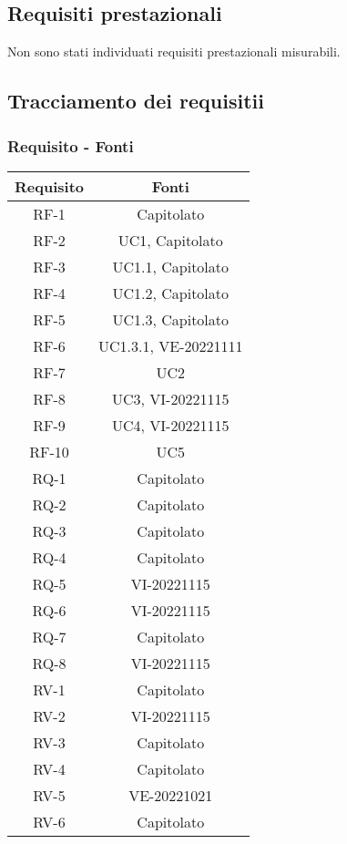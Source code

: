 \subsection{Requisiti prestazionali}
Non sono stati individuati requisiti prestazionali misurabili.


\subsection{Tracciamento dei requisitii}

\subsubsection{Requisito - Fonti}
\begin{tabular}{| c | c |} 
 \hline
 \textbf{Requisito} & \textbf{Fonti} \\
 \hline
  RF-1 & Capitolato\\
\hline
  RF-2 & UC1, Capitolato\\
\hline
  RF-3 & UC1.1, Capitolato\\
\hline
  RF-4 & UC1.2, Capitolato\\
\hline
  RF-5 & UC1.3, Capitolato\\
\hline
  RF-6 & UC1.3.1, VE-20221111\\
\hline
  RF-7 & UC2\\
\hline
  RF-8 & UC3, VI-20221115\\
\hline
  RF-9 & UC4, VI-20221115\\
\hline
  RF-10 & UC5\\
\hline
  RQ-1 & Capitolato\\
\hline
  RQ-2 & Capitolato\\
\hline
  RQ-3 & Capitolato\\
\hline
  RQ-4 & Capitolato\\
\hline
  RQ-5 & VI-20221115\\
\hline
  RQ-6 & VI-20221115\\
\hline
  RQ-7 & Capitolato\\
\hline
  RQ-8 & VI-20221115\\
\hline
  RV-1 & Capitolato\\
\hline
  RV-2 & VI-20221115\\
\hline
  RV-3 & Capitolato\\
\hline
  RV-4 & Capitolato\\
\hline
  RV-5 & VE-20221021\\
\hline
  RV-6 & Capitolato\\
\hline
\end{tabular}

